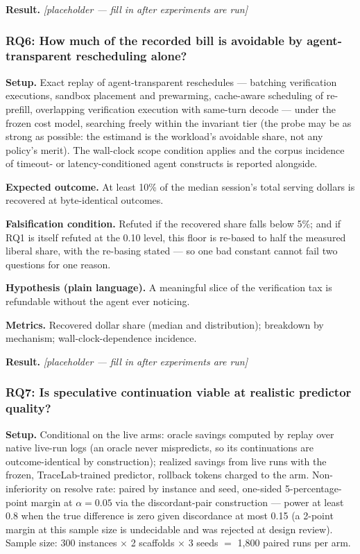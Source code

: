\documentclass[11pt]{article}
\newcommand{\ph}{\textit{[placeholder --- fill in after experiments are run]}}
\begin{document}
\textbf{Result.} \ph

\subsubsection{RQ6: How much of the recorded bill is avoidable by agent-transparent rescheduling alone?}

\textbf{Setup.} Exact replay of agent-transparent reschedules --- batching verification executions, sandbox placement and prewarming, cache-aware scheduling of re-prefill, overlapping verification execution with same-turn decode --- under the frozen cost model, searching freely within the invariant tier (the probe may be as strong as possible: the estimand is the workload's avoidable share, not any policy's merit). The wall-clock scope condition applies and the corpus incidence of timeout- or latency-conditioned agent constructs is reported alongside.

\textbf{Expected outcome.} At least 10\% of the median session's total serving dollars is recovered at byte-identical outcomes.

\textbf{Falsification condition.} Refuted if the recovered share falls below 5\%; and if RQ1 is itself refuted at the 0.10 level, this floor is re-based to half the measured liberal share, with the re-basing stated --- so one bad constant cannot fail two questions for one reason.

\textbf{Hypothesis (plain language).} A meaningful slice of the verification tax is refundable without the agent ever noticing.

\textbf{Metrics.} Recovered dollar share (median and distribution); breakdown by mechanism; wall-clock-dependence incidence.

\textbf{Result.} \ph

\subsubsection{RQ7: Is speculative continuation viable at realistic predictor quality?}

\textbf{Setup.} Conditional on the live arms: oracle savings computed by replay over native live-run logs (an oracle never mispredicts, so its continuations are outcome-identical by construction); realized savings from live runs with the frozen, TraceLab-trained predictor, rollback tokens charged to the arm. Non-inferiority on resolve rate: paired by instance and seed, one-sided 5-percentage-point margin at $\alpha = 0.05$ via the discordant-pair construction --- power at least 0.8 when the true difference is zero given discordance at most 0.15 (a 2-point margin at this sample size is undecidable and was rejected at design review). Sample size: 300 instances $\times$ 2 scaffolds $\times$ 3 seeds $=$ 1{,}800 paired runs per arm.
\end{document}
